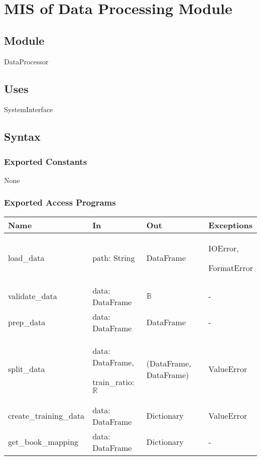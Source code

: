 \documentclass[12pt, titlepage]{article}
\begin{document}
\newpage

\section{MIS of Data Processing Module} \label{ModuleDP}

\subsection{Module}

DataProcessor

\subsection{Uses}
SystemInterface

\subsection{Syntax}

\subsubsection{Exported Constants}
None
\subsubsection{Exported Access Programs}

\begin{center}
  \begin{tabular}{p{4cm} p{4cm} p{4cm} p{2cm}}
  \hline
  \textbf{Name} & \textbf{In} & \textbf{Out} & \textbf{Exceptions} \\
  \hline
  load\_data & path: String &  DataFrame & IOError,
  
  FormatError\\
  \hline
  validate\_data & data: DataFrame &  $\mathbb{B}$ & -\\
  \hline
  prep\_data & data: DataFrame &  DataFrame & - \\
  \hline
  split\_data & data: DataFrame,
  
  train\_ratio: $\mathbb{R}$ &  (DataFrame, DataFrame) & ValueError \\
  \hline
  create\_training\_data & data: DataFrame & Dictionary & ValueError \\
  \hline
  get\_book\_mapping & data: DataFrame & Dictionary & - \\
  \hline
  \end{tabular}
  \end{center}
\end{document}
